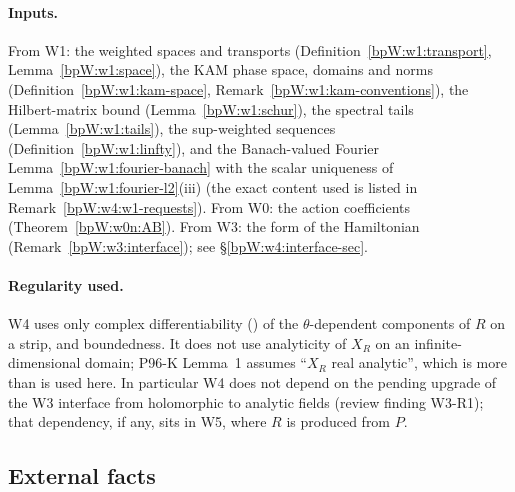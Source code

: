 \paragraph{Inputs.} From W1: the weighted spaces and transports (Definition~\ref{bpW:w1:transport},
Lemma~\ref{bpW:w1:space}), the KAM phase space, domains and norms (Definition~\ref{bpW:w1:kam-space},
Remark~\ref{bpW:w1:kam-conventions}), the Hilbert-matrix bound (Lemma~\ref{bpW:w1:schur}), the spectral tails
(Lemma~\ref{bpW:w1:tails}), the sup-weighted sequences (Definition~\ref{bpW:w1:linfty}), and the Banach-valued
Fourier Lemma~\ref{bpW:w1:fourier-banach} with the scalar uniqueness of Lemma~\ref{bpW:w1:fourier-l2}(iii) (the exact
content used is listed in Remark~\ref{bpW:w4:w1-requests}). From W0: the action coefficients
(Theorem~\ref{bpW:w0n:AB}). From W3: the form of the Hamiltonian (Remark~\ref{bpW:w3:interface}); see
\S\ref{bpW:w4:interface-sec}.

\paragraph{Regularity used.} W4 uses only complex differentiability () of the
$\theta$-dependent components of $R$ on a strip, and boundedness. It does not use analyticity of $X_R$ on an
infinite-dimensional domain; P96-K Lemma~1 assumes ``$X_R$ real analytic'', which is more than is used here. In
particular W4 does not depend on the pending upgrade of the W3 interface from holomorphic to analytic fields
(review finding W3-R1); that dependency, if any, sits in W5, where $R$ is produced from $P$.

\subsection{External facts}\label{bpW:w4:ext}

